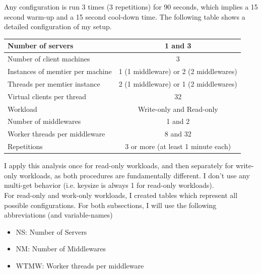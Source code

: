 \documentclass[11pt,a4paper]{article}
\begin{document}
Any configuration is run 3 times (3 repetitions) for 90 seconds, which implies a 15 second warm-up and a 15 second cool-down time.
The following table shows a detailed configuration of my setup.

\begin{center}
	\scriptsize{
		\begin{tabular}{|l|c|}
			\hline Number of servers                & 1 and 3                                     \\ 
			\hline Number of client machines        & 3                                           \\ 
			\hline Instances of memtier per machine & 1 (1 middleware) or 2 (2 middlewares) \\ 
			\hline Threads per memtier instance     & 2 (1 middleware) or 1 (2 middlewares)   \\
			\hline Virtual clients per thread       &  32                                     \\ 
			\hline Workload                         & Write-only and Read-only\\
			\hline Number of middlewares            & 1 and 2                                     \\
			\hline Worker threads per middleware    & 8 and 32                                    \\
			\hline Repetitions                      & 3 or more (at least 1 minute each)                                   \\ 
			\hline 
		\end{tabular}
	} 
\end{center}

I apply this analysis once for read-only workloads, and then separately for write-only workloads, as both procedures are fundamentally different.
I don't use any multi-get behavior (i.e. keysize is always 1 for read-only workloads). \\

For read-only and work-only workloads, I created tables which represent all possible configurations.
For both subsections, I will use the following abbreviations (and variable-names)

\begin{itemize}
\item NS: Number of Servers
\item NM: Number of Middlewares
\item WTMW: Worker threads per middleware
\end{itemize}
\end{document}
